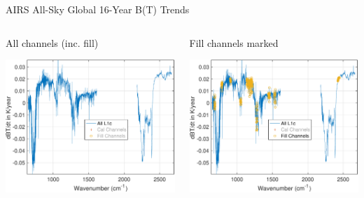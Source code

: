 \documentclass[10pt,t]{beamer}
\begin{document}
\begin{frame}[label={sec:orgbce5e15}]{AIRS All-Sky Global 16-Year B(T) Trends}
\vspace{-0.35in}

\begin{columns}
\begin{column}{0.55\columnwidth}
\begin{block}{\footnotesize All channels (inc. fill)}
\vspace{-0.1in}
\begin{center}
\includegraphics[width=0.85\linewidth]{./Figs/Pdf/rand_global_trend_l1c_overview.pdf}
\end{center}
\end{block}
\end{column}


\begin{column}{0.55\columnwidth}
\begin{block}{\footnotesize Fill channels marked}
\vspace{-0.1in}
\begin{center}
\includegraphics[width=0.85\linewidth]{./Figs/Pdf/rand_global_trend_l1c_overview_fill_marked.pdf}
\end{center}
\end{block}
\end{column}
\end{columns}



\end{frame}
\end{document}
